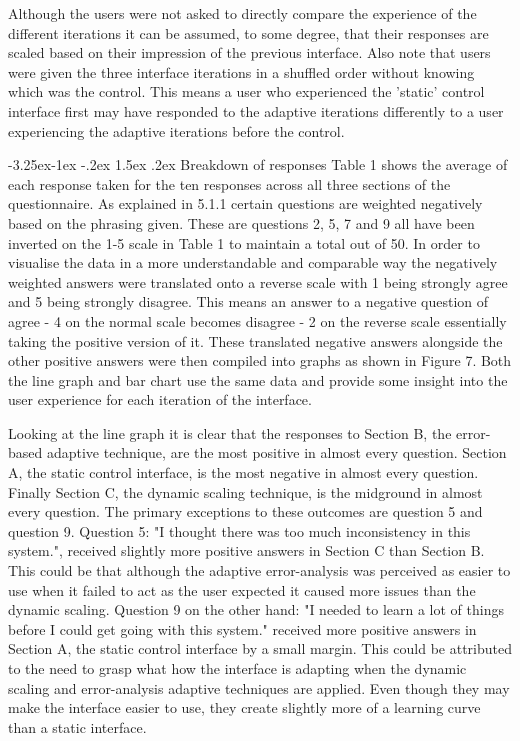 \documentclass[12pt]{article}
\makeatletter
\renewcommand{\subsubsection}{\@startsection{subsubsection}{2}{\z@}%
             {-3.25ex\@plus -1ex \@minus -.2ex}%
             {1.5ex \@plus .2ex}%
             {\normalfont\normalsize\scshape\bfseries}}
\makeatother
\begin{document}
Although the users were not asked to directly compare the experience of the different iterations it can be assumed, to some degree, that their responses are scaled based on their impression of the previous interface. Also note that users were given the three interface iterations in a shuffled order without knowing which was the control. This means a user who experienced the 'static' control interface first may have responded to the adaptive iterations differently to a user experiencing the adaptive iterations before the control.

\subsubsection{Breakdown of responses}
Table 1 shows the average of each response taken for the ten responses across all three sections of the questionnaire. As explained in 5.1.1 certain questions are weighted negatively based on the phrasing given. These are questions 2, 5, 7 and 9 all have been inverted on the 1-5 scale in Table 1 to maintain a total out of 50. In order to visualise the data in a more understandable and comparable way the negatively weighted answers were translated onto a reverse scale with 1 being strongly agree and 5 being strongly disagree. This means an answer to a negative question of agree - 4 on the normal scale becomes disagree - 2 on the reverse scale essentially taking the positive version of it. These translated negative answers alongside the other positive answers were then compiled into graphs as shown in Figure 7. Both the line graph and bar chart use the same data and provide some insight into the user experience for each iteration of the interface.

Looking at the line graph it is clear that the responses to Section B, the error-based adaptive technique, are the most positive in almost every question. Section A, the static control interface, is the most negative in almost every question. Finally Section C, the dynamic scaling technique, is the midground in almost every question. The primary exceptions to these outcomes are question 5 and  question 9. Question 5: "I thought there was too much inconsistency in this system.", received slightly more positive answers in Section C than Section B. This could be that although the adaptive error-analysis was perceived as easier to use when it failed to act as the user expected it caused more issues than the dynamic scaling. Question 9 on the other hand: "I needed to learn a lot of things before I could get going with this system." received more positive answers in Section A, the static control interface by a small margin. This could be attributed to the need to grasp what how the interface is adapting when the dynamic scaling and error-analysis adaptive techniques are applied. Even though they may make the interface easier to use, they create slightly more of a learning curve than a static interface.
\end{document}
